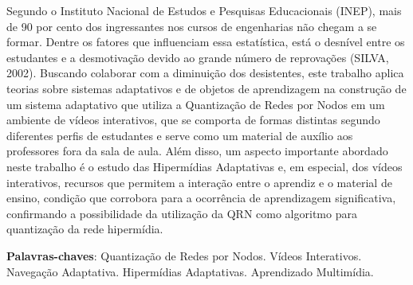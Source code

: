 \begin{resumo}
Segundo o Instituto Nacional de Estudos e Pesquisas Educacionais (INEP), mais de 90 por cento dos ingressantes nos cursos de engenharias não chegam a se formar. Dentre os fatores que influenciam essa estatística, está o desnível entre os estudantes e a desmotivação devido ao grande número de reprovações (SILVA, 2002). Buscando colaborar com a diminuição dos desistentes, este trabalho aplica teorias sobre sistemas adaptativos e de objetos de aprendizagem na construção de um sistema adaptativo que utiliza a Quantização de Redes por Nodos em um ambiente de vídeos interativos, que se comporta de formas distintas segundo diferentes perfis de estudantes e serve como um material de auxílio aos professores fora da sala de aula. Além disso, um aspecto importante abordado neste trabalho é o estudo das Hipermídias Adaptativas e, em especial, dos vídeos interativos, recursos que permitem a interação entre o aprendiz e o material de ensino, condição que corrobora para a ocorrência de aprendizagem significativa, confirmando a possibilidade da utilização da QRN como algoritmo para quantização da rede hipermídia.

 \vspace{\onelineskip}
    
 \noindent
 \textbf{Palavras-chaves}: Quantização de Redes por Nodos. Vídeos Interativos. Navegação Adaptativa. Hipermídias Adaptativas. Aprendizado Multimídia.
\end{resumo}
